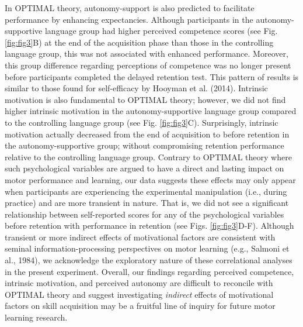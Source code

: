 \documentclass[
  doc, donotrepeattitle,floatsintext]{apa7}
\begin{document}
In OPTIMAL theory, autonomy-support is also predicted to facilitate performance by enhancing expectancies. Although participants in the autonomy-supportive language group had higher perceived competence scores (see Fig. \ref{fig:fig3}B) at the end of the acquisition phase than those in the controlling language group, this was not associated with enhanced performance. Moreover, this group difference regarding perceptions of competence was no longer present before participants completed the delayed retention test. This pattern of results is similar to those found for self-efficacy by Hooyman et al. (2014). Intrinsic motivation is also fundamental to OPTIMAL theory; however, we did not find higher intrinsic motivation in the autonomy-supportive language group compared to the controlling language group (see Fig. \ref{fig:fig3}C). Surprisingly, intrinsic motivation actually decreased from the end of acquisition to before retention in the autonomy-supportive group; without compromising retention performance relative to the controlling language group. Contrary to OPTIMAL theory where such psychological variables are argued to have a direct and lasting impact on motor performance and learning, our data suggests these effects may only appear when participants are experiencing the experimental manipulation (i.e., during practice) and are more transient in nature. That is, we did not see a significant relationship between self-reported scores for any of the psychological variables before retention with performance in retention (see Figs. \ref{fig:fig3}D-F). Although transient or more indirect effects of motivational factors are consistent with seminal information-processing perspectives on motor learning (e.g., Salmoni et al., 1984), we acknowledge the exploratory nature of these correlational analyses in the present experiment. Overall, our findings regarding perceived competence, intrinsic motivation, and perceived autonomy are difficult to reconcile with OPTIMAL theory and suggest investigating \emph{indirect} effects of motivational factors on skill acquisition may be a fruitful line of inquiry for future motor learning research.
\end{document}
